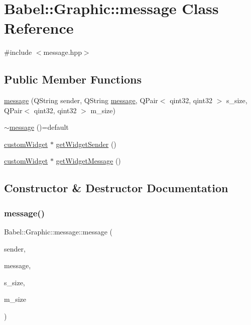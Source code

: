 \hypertarget{classBabel_1_1Graphic_1_1message}{}\section{Babel\+:\+:Graphic\+:\+:message Class Reference}
\label{classBabel_1_1Graphic_1_1message}


{\ttfamily \#include $<$message.\+hpp$>$}

\subsection*{Public Member Functions}
\begin{DoxyCompactItemize}
\item 
\hyperlink{classBabel_1_1Graphic_1_1message_a89486bcaf23fa6b4f9d8f13156b0ea6d}{message} (Q\+String sender, Q\+String \hyperlink{classBabel_1_1Graphic_1_1message}{message}, Q\+Pair$<$ qint32, qint32 $>$ s\+\_\+size, Q\+Pair$<$ qint32, qint32 $>$ m\+\_\+size)
\item 
\hyperlink{classBabel_1_1Graphic_1_1message_a23bd495ef13982b30ef49eb240b6a778}{$\sim$message} ()=default
\item 
\hyperlink{classBabel_1_1Graphic_1_1customWidget}{custom\+Widget} $\ast$ \hyperlink{classBabel_1_1Graphic_1_1message_a57271867030768a181be8295f995d075}{get\+Widget\+Sender} ()
\item 
\hyperlink{classBabel_1_1Graphic_1_1customWidget}{custom\+Widget} $\ast$ \hyperlink{classBabel_1_1Graphic_1_1message_ae10aebafa735914db513e663f29442fb}{get\+Widget\+Message} ()
\end{DoxyCompactItemize}


\subsection{Constructor \& Destructor Documentation}
\mbox{\label{classBabel_1_1Graphic_1_1message_a89486bcaf23fa6b4f9d8f13156b0ea6d}} 
\subsubsection{\texorpdfstring{message()}{message()}}
{\footnotesize\ttfamily Babel\+::\+Graphic\+::message\+::message (\begin{DoxyParamCaption}\item[{Q\+String}]{sender,  }\item[{Q\+String}]{message,  }\item[{Q\+Pair$<$ qint32, qint32 $>$}]{s\+\_\+size,  }\item[{Q\+Pair$<$ qint32, qint32 $>$}]{m\+\_\+size }\end{DoxyParamCaption})}

